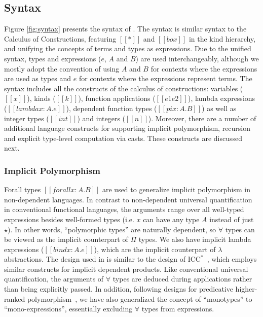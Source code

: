 \subsection{Syntax}

Figure \ref{fig:syntax} presents the syntax of \name. The syntax is similar
syntax to the Calculus of Constructions, featuring
$[[*]]$ and $[[box]]$ in the kind hierarchy, and unifying the concepts of terms
and types as expressions. Due to the unified syntax, types and
expressions ($e$, $A$ and $B$) are used
interchangeably, although we mostly adopt the convention of using $A$ and $B$
for contexts where the expressions are used as types and $e$ for contexts
where the expressions represent terms.
The syntax includes all the constructs of the calculus of constructions:
variables ($[[x]]$), kinds ($[[k]]$), function applications  ($[[e1 e2]]$),
lambda expressions ($[[lambda x : A. e]]$), dependent function types ($[[pi x : A. B]]$)
as well as integer types ($[[int]]$) and integers ($[[n]]$).
Moreover, there are a number of additional language constructs for
supporting implicit polymorphism, recursion and explicit type-level computation
via casts. These constructs are discussed next.

\subsubsection{Implicit Polymorphism}

Forall types $[[forall x : A. B]]$ are used to generalize implicit
polymorphism in non-dependent languages. In contrast to non-dependent
universal quantification in conventional functional languages, the
arguments range over all well-typed expressions besides well-formed
types (i.e. $x$ can have any type $A$ instead of just $\star$).
In other words, ``polymorphic types'' are naturally dependent, so $\forall$
types can be viewed as the implicit counterpart of $\Pi$ types. We also have
implicit lambda expressions ($[[bind x : A. e]]$), which are the implicit counterpart of
  $\lambda$ abstractions. The design used in \name
  is similar to the design of $\text{ICC}^*$~\cite{barras2008implicit}, which
  employs similar constructs for implicit dependent products.
Like conventional universal quantification, the arguments of $\forall$ types are
deduced during applications rather than being explicitly passed.
In addition, following designs for predicative higher-ranked polymorphism~\cite{oderskylufer,DK,PJ}, we have also generalized the concept of ``monotypes'' to
``mono-expressions'', essentially excluding $\forall$ types from expressions.

